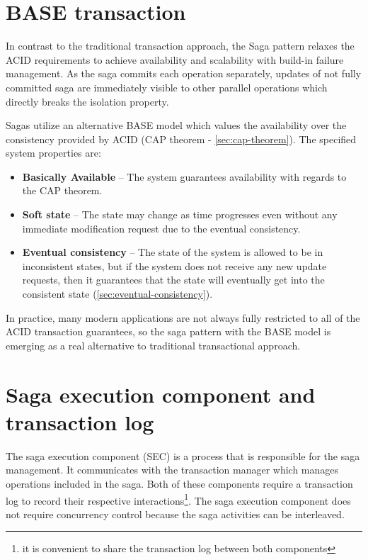 \documentclass[oneside,
  digital, %
  table,   %
  lof,     %
  lot,     %
]{fithesis3}
\begin{document}
\section{BASE transaction}
\label{sec:base}

In contrast to the traditional transaction approach, the Saga pattern relaxes the ACID requirements to achieve availability and scalability with build-in failure management. As the saga commits each operation separately, updates of not fully committed saga are immediately visible to other parallel operations \cite{trans_concept} which directly breaks the isolation property.

Sagas utilize an alternative BASE model \cite{life-beyond-dist-tran-helland, building-on-quicksand} which values the availability over the consistency provided by ACID (CAP theorem - \ref{sec:cap-theorem}). The specified system properties are:

\begin{itemize}
    \item \textbf{Basically Available} -- The system guarantees availability with regards to the CAP theorem.
    
    \item \textbf{Soft state} -- The state may change as time progresses even without any immediate modification request due to the eventual consistency.
    
    \item \textbf{Eventual consistency} -- The state of the system is allowed to be in inconsistent states, but if the system does not receive any new update requests, then it guarantees that the state will eventually get into the consistent state (\ref{sec:eventual-consistency}).
\end{itemize}

In practice, many modern applications are not always fully restricted to all of the ACID transaction guarantees, so the saga pattern with the BASE model is emerging as a real alternative to traditional transactional approach.

\section{Saga execution component and transaction log}

The saga execution component (SEC) is a process that is responsible for the saga management. It communicates with the transaction manager which manages operations included in the saga. Both of these components require a transaction log to record their respective interactions\footnote{it is convenient to share the transaction log between both components}. The saga execution component does not require  concurrency control because the saga activities can be interleaved.
\end{document}
